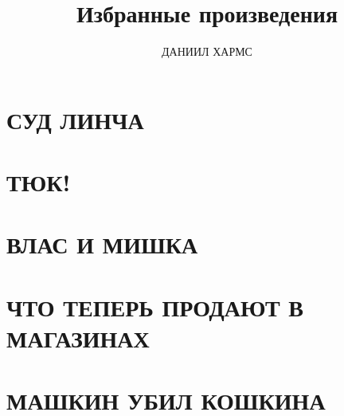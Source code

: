 \documentclass[12pt]{book}
\title{Избранные произведения}
\author{ДАНИИЛ ХАРМС}
\date{}
\begin{document}
\setlength{\parindent}{1.5cm}
\maketitle
\vspace*{-\baselineskip}

\chapter{СУД ЛИНЧА}


\chapter{ТЮК!}


\chapter{ВЛАС И МИШКА}


\chapter{ЧТО ТЕПЕРЬ ПРОДАЮТ В МАГАЗИНАХ}


\chapter{МАШКИН УБИЛ КОШКИНА}

\end{document}
